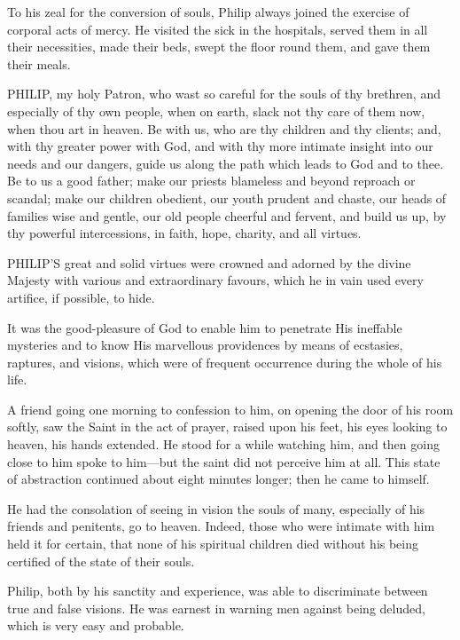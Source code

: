 To his zeal for the conversion
of souls, Philip always joined the exercise of corporal acts of mercy.
He visited the sick in the hospitals, served them in all their
necessities, made their beds, swept the floor round them, and gave them
their meals.


PHILIP, my holy
Patron, who wast so careful for the souls of thy brethren, and
especially of thy own people, when on earth, slack not thy care of them
now, when thou art in heaven. Be with us, who are thy children and thy
clients; and, with thy greater power with God, and with thy more
intimate insight into our needs and our dangers, guide us along the path
which leads to God and to thee. Be to us a good father; make our priests
blameless and beyond reproach or scandal; make our children obedient,
our youth prudent and chaste, our heads of families wise and gentle, our
old people cheerful and fervent, and build us up, by thy powerful
intercessions, in faith, hope, charity, and all virtues.



PHILIP'S great and
solid virtues were crowned and adorned by the divine Majesty with
various and extraordinary favours, which he in vain used every artifice,
if possible, to hide.

It was the good-pleasure of God
to enable him to penetrate His ineffable mysteries and to know His
marvellous providences by means of ecstasies, raptures, and visions,
which were of frequent occurrence during the whole of his life.

A friend going one morning to
confession to him, on opening the door of his room softly, saw the Saint
in the act of prayer, raised upon his feet, his eyes looking to heaven,
his hands extended. He stood for a while watching him, and then going
close to him spoke to him—but the saint did not perceive him at all.
This state of abstraction continued about eight minutes longer; then he
came to himself.

He had the consolation of seeing
in vision the souls of many, especially of his friends and penitents, go
to heaven. Indeed, those who were intimate with him held it for certain,
that none of his spiritual children died without his being
certified of the state of their souls.

Philip, both by his sanctity and
experience, was able to discriminate between true and false visions. He
was earnest in warning men against being deluded, which is very easy and
probable.

